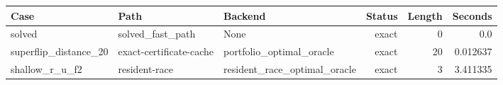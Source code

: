 {\small
\begin{tabular}{lllrrr}
\hline
Case & Path & Backend & Status & Length & Seconds \\
\hline
solved & solved\_fast\_path & None & exact & 0 & 0.0 \\
superflip\_distance\_20 & exact-certificate-cache & portfolio\_optimal\_oracle & exact & 20 & 0.012637 \\
shallow\_r\_u\_f2 & resident-race & resident\_race\_optimal\_oracle & exact & 3 & 3.411335 \\
\hline
\end{tabular}
}
